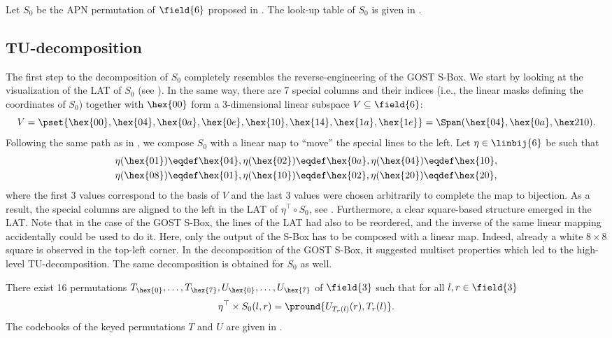
Let $S_0$ be the APN permutation of $\field{6}$ proposed in \cite{DillonAPN}. The look-up table of $S_0$ is given in .


\subsection{TU-decomposition}


The first step to the decomposition of $S_0$ completely resembles the reverse-engineering of the GOST S-Box. We start by looking at the visualization of the LAT of $S_0$ (see ). In the same way, there are 7 special columns and their indices (i.e., the linear masks defining the coordinates of $S_0$) together with $\hex{00}$ form a 3-dimensional linear subspace $V \subseteq \field{6}$:
$$
V = \pset{\hex{00},\hex{04},\hex{0a},\hex{0e},\hex{10},\hex{14},\hex{1a},\hex{1e}} = \Span(\hex{04},\hex{0a},\hex2{10}).
$$
Following the same path as in , we compose $S_0$ with a linear map to ``move'' the special lines to the left. Let $\eta\in \linbij{6}$ be such that
\begin{align*}
& \eta(\hex{01}) \eqdef \hex{04}, \eta(\hex{02}) \eqdef \hex{0a}, \eta(\hex{04}) \eqdef \hex{10}, \\
& \eta(\hex{08}) \eqdef \hex{01}, \eta(\hex{10}) \eqdef \hex{02}, \eta(\hex{20}) \eqdef \hex{20},\\
\end{align*}
where the first 3 values correspond to the basis of $V$ and the last 3 values were chosen arbitrarily to complete the map to bijection. As a result, the special columns are aligned to the left in the LAT of $\eta^{\top} \circ S_0$, see . Furthermore, a clear square-based structure emerged in the LAT. Note that in the case of the GOST S-Box, the lines of the LAT had also to be reordered, and the inverse of the same linear mapping accidentally could be used to do it. Here, only the output of the S-Box has to be composed with a linear map. Indeed, already a white $8\times 8$ square is observed in the top-left corner. In the decomposition of the GOST S-Box, it suggested multiset properties which led to the high-level TU-decomposition. The same decomposition is obtained for $S_0$ as well.

\begin{proposition}
There exist 16 permutations $T_{\hex{0}},\ldots, T_{\hex{7}},U_{\hex{0}},\ldots, U_{\hex{7}}$ of $\field{3}$ such that for all $l,r \in \field{3}$
$$
\eta^{\top}\times S_0(l,r) = \pround{U_{T_r(l)}(r), T_r(l)}.
$$
The codebooks of the keyed permutations $T$ and $U$ are given in .
\end{proposition}

